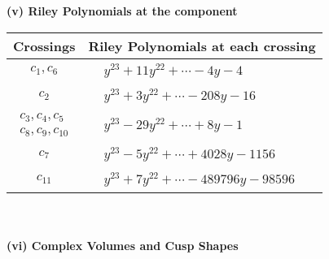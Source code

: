 \documentclass[1p]{elsarticle_modified}
\theoremstyle{definition}
\begin{document}
\newpage\renewcommand{\arraystretch}{1}
\flushleft \textbf{(v) Riley Polynomials at the component}\newline \\
\begin{tabular}{m{50pt}|m{274pt}}
Crossings & \hspace{64pt}Riley Polynomials at each crossing \\
\hline $$\begin{aligned}c_{1},c_{6}\end{aligned}$$&$\begin{aligned}
&y^{23}+11 y^{22}+\cdots-4 y-4
\end{aligned}$\\
\hline $$\begin{aligned}c_{2}\end{aligned}$$&$\begin{aligned}
&y^{23}+3 y^{22}+\cdots-208 y-16
\end{aligned}$\\
\hline $$\begin{aligned}c_{3},c_{4},c_{5}\\c_{8},c_{9},c_{10}\end{aligned}$$&$\begin{aligned}
&y^{23}-29 y^{22}+\cdots+8 y-1
\end{aligned}$\\
\hline $$\begin{aligned}c_{7}\end{aligned}$$&$\begin{aligned}
&y^{23}-5 y^{22}+\cdots+4028 y-1156
\end{aligned}$\\
\hline $$\begin{aligned}c_{11}\end{aligned}$$&$\begin{aligned}
&y^{23}+7 y^{22}+\cdots-489796 y-98596
\end{aligned}$\\
\hline
\end{tabular}\\~\\
\newpage\flushleft \textbf{(vi) Complex Volumes and Cusp Shapes}
\end{document}
